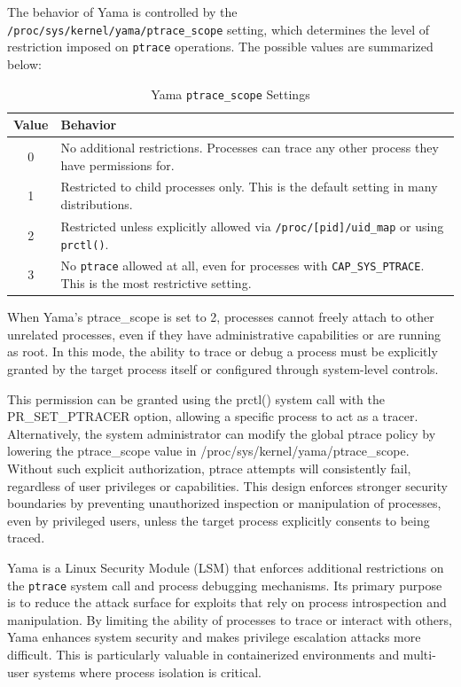 \documentclass[12pt]{report}
\begin{document}
\begin{doublespace}
The behavior of Yama is controlled by the \texttt{/proc/sys/kernel/yama/ptrace\_scope} setting, which determines the level of restriction imposed on \texttt{ptrace} operations. The possible values are summarized below:

\begin{table}[h]
    \centering
    \caption{Yama \texttt{ptrace\_scope} Settings}
    \label{tab:yama-settings}
    \begin{tabular}{|c|p{10cm}|}
        \hline
        \textbf{Value} & \textbf{Behavior} \\
        \hline
        0 & No additional restrictions. Processes can trace any other process they have permissions for. \\
        \hline
        1 & Restricted to child processes only. This is the default setting in many distributions. \\
        \hline
        2 & Restricted unless explicitly allowed via \texttt{/proc/[pid]/uid\_map} or using \texttt{prctl()}. \\
        \hline
        3 & No \texttt{ptrace} allowed at all, even for processes with \texttt{CAP\_SYS\_PTRACE}. This is the most restrictive setting. \\
        \hline
    \end{tabular}
\end{table}

When Yama’s ptrace\_scope is set to 2, processes cannot freely attach to other unrelated processes, even if they have administrative capabilities or are running as root. In this mode, the ability to trace or debug a process must be explicitly granted by the target process itself or configured through system-level controls.

This permission can be granted using the prctl() system call with the PR\_SET\_PTRACER option, allowing a specific process to act as a tracer. Alternatively, the system administrator can modify the global ptrace policy by lowering the ptrace\_scope value in /proc/sys/kernel/yama/ptrace\_scope. Without such explicit authorization, ptrace attempts will consistently fail, regardless of user privileges or capabilities. This design enforces stronger security boundaries by preventing unauthorized inspection or manipulation of processes, even by privileged users, unless the target process explicitly consents to being traced.



Yama is a Linux Security Module (LSM) that enforces additional restrictions on the \texttt{ptrace} system call and process debugging mechanisms. Its primary purpose is to reduce the attack surface for exploits that rely on process introspection and manipulation. By limiting the ability of processes to trace or interact with others, Yama enhances system security and makes privilege escalation attacks more difficult. This is particularly valuable in containerized environments and multi-user systems where process isolation is critical.


\end{doublespace} 	\fontsize{12pt}{14pt} \selectfont
\end{document}

